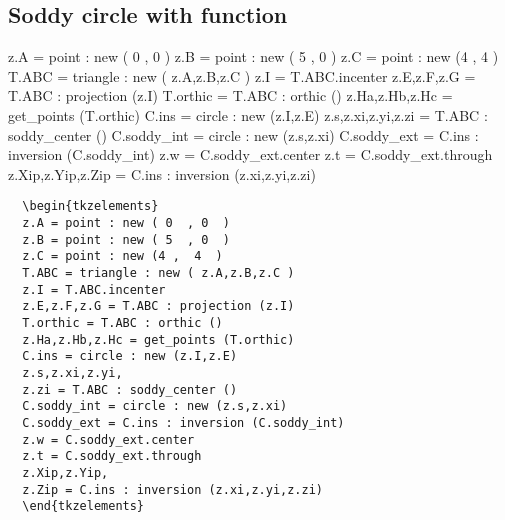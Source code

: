 
\subsection{Soddy circle with function} %
\label{sub:soddy_circle_with_function}

\begin{tkzelements}
z.A = point : new ( 0  , 0  )
z.B = point : new ( 5  , 0  )
z.C = point : new (4 ,  4  )
T.ABC = triangle : new ( z.A,z.B,z.C )
z.I = T.ABC.incenter
z.E,z.F,z.G = T.ABC : projection (z.I)
T.orthic = T.ABC : orthic ()
z.Ha,z.Hb,z.Hc = get_points (T.orthic)
C.ins = circle : new (z.I,z.E)
z.s,z.xi,z.yi,z.zi = T.ABC : soddy_center ()
C.soddy_int = circle : new (z.s,z.xi)
C.soddy_ext = C.ins : inversion (C.soddy_int)
z.w = C.soddy_ext.center
z.t = C.soddy_ext.through
z.Xip,z.Yip,z.Zip = C.ins : inversion (z.xi,z.yi,z.zi)
\end{tkzelements}

\begin{minipage}{.5\textwidth}
  \begin{Verbatim}
  \begin{tkzelements}
  z.A = point : new ( 0  , 0  )
  z.B = point : new ( 5  , 0  )
  z.C = point : new (4 ,  4  )
  T.ABC = triangle : new ( z.A,z.B,z.C )
  z.I = T.ABC.incenter
  z.E,z.F,z.G = T.ABC : projection (z.I)
  T.orthic = T.ABC : orthic ()
  z.Ha,z.Hb,z.Hc = get_points (T.orthic)
  C.ins = circle : new (z.I,z.E)
  z.s,z.xi,z.yi,
  z.zi = T.ABC : soddy_center ()
  C.soddy_int = circle : new (z.s,z.xi)
  C.soddy_ext = C.ins : inversion (C.soddy_int)
  z.w = C.soddy_ext.center
  z.t = C.soddy_ext.through
  z.Xip,z.Yip,
  z.Zip = C.ins : inversion (z.xi,z.yi,z.zi)
  \end{tkzelements}
\end{Verbatim}
\end{minipage}
\begin{minipage}{.5\textwidth}
\end{minipage}

